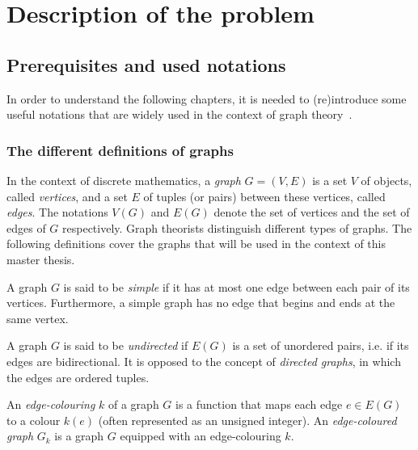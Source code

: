 \setcounter{secnumdepth}{2}

\chapter{Description of the problem}
\label{ch:description-of-the-problem}


\section{Prerequisites and used notations}
\label{sec:prerequisites-and-used-notations}

In order to understand the following chapters, it is needed to (re)introduce some useful notations that are widely used in the context of graph theory~\cite{graphtheory}.


\subsection{The different definitions of graphs}
\label{subsec:the-different-definitions-of-graphs}

In the context of discrete mathematics, a \textit{graph} $G = (V, E)$ is a set $V$ of objects, called \textit{vertices}, and a set $E$ of tuples (or pairs) between these vertices, called \textit{edges}.
The notations $V(G)$ and $E(G)$ denote the set of vertices and the set of edges of $G$ respectively.
Graph theorists distinguish different types of graphs.
The following definitions cover the graphs that will be used in the context of this master thesis.

\begin{definition}
    \label{def:simple_graph}
    A graph $G$ is said to be \textit{simple} if it has at most one edge between each pair of its vertices.
    Furthermore, a simple graph has no edge that begins and ends at the same vertex.
\end{definition}

\begin{definition}
    \label{def:undirected_graph}
    A graph $G$ is said to be \textit{undirected} if $E(G)$ is a set of unordered pairs, i.e. if its edges are bidirectional. It is opposed to the concept of \textit{directed graphs}, in which the edges are ordered tuples.
\end{definition}

\begin{definition}
    \label{def:edge_coloured_graph}
    An \textit{edge-colouring} $k$ of a graph $G$ is a function that maps each edge $e \in E(G)$ to a colour $k(e)$ (often represented as an unsigned integer). An \textit{edge-coloured graph} $G_k$ is a graph $G$ equipped with an edge-colouring $k$.
\end{definition}

